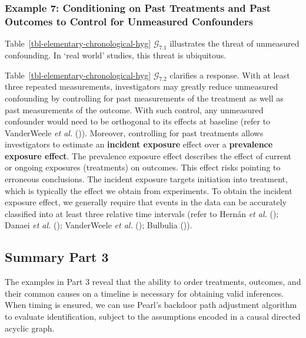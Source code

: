 \documentclass[
  single column]{article}
\begin{document}
\subsubsection{Example 7: Conditioning on Past Treatments and Past
Outcomes to Control for Unmeasured
Confounders}\label{example-7-conditioning-on-past-treatments-and-past-outcomes-to-control-for-unmeasured-confounders}

Table~\ref{tbl-elementary-chronological-hyg} \(\mathcal{G}_{7.1}\)
illustrates the threat of unmeasured confounding. In `real world'
studies, this threat is ubiquitous.

Table~\ref{tbl-elementary-chronological-hyg} \(\mathcal{G}_{7.2}\)
clarifies a response. With at least three repeated measurements,
investigators may greatly reduce unmeasured confounding by controlling
for past measurements of the treatment as well as past measurements of
the outcome. With such control, any unmeasured confounder would need to
be orthogonal to its effects at baseline (refer to VanderWeele \emph{et
al.} ()). Moreover, controlling for
past treatments allows investigators to estimate an \textbf{incident
exposure} effect over a \textbf{prevalence exposure effect}. The
prevalence exposure effect describes the effect of current or ongoing
exposures (treatments) on outcomes. This effect risks pointing to
erroneous conclusions. The incident exposure targets initiation into
treatment, which is typically the effect we obtain from experiments. To
obtain the incident exposure effect, we generally require that events in
the data can be accurately classified into at least three relative time
intervals (refer to Hernán \emph{et al.}
(); Danaei \emph{et al.}
(); VanderWeele \emph{et al.}
(); Bulbulia
()).

\subsection{Summary Part 3}\label{summary-part-3}

The examples in Part 3 reveal that the ability to order treatments,
outcomes, and their common causes on a timeline is necessary for
obtaining valid inferences. When timing is ensured, we can use Pearl's
backdoor path adjustment algorithm to evaluate identification, subject
to the assumptions encoded in a causal directed acyclic graph.

\newpage{}
\end{document}
